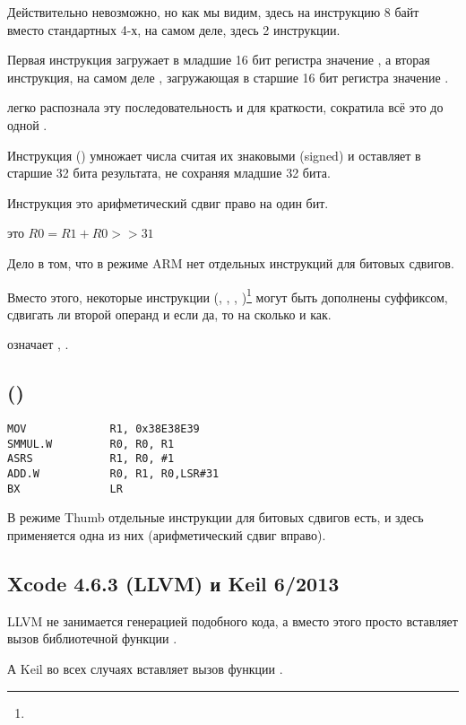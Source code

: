 Действительно невозможно, но как мы видим, здесь на инструкцию 8 байт вместо стандартных 4-х,
на самом деле, здесь 2 инструкции.

Первая инструкция загружает в младшие 16 бит регистра значение , а вторая инструкция, 
на самом деле , загружающая в старшие 16 бит регистра значение .

\IDA легко распознала эту последовательность и для краткости, сократила всё это до одной .

Инструкция  () 
умножает числа считая их знаковыми (signed) и оставляет в  старшие 32 бита результата, 
не сохраняя младшие 32 бита.

Инструкция это арифметический сдвиг право на один бит.

 это $R0=R1 + R0>>31$

\label{shifts_in_ARM_mode}
Дело в том, что в режиме ARM нет отдельных инструкций для битовых сдвигов.

Вместо этого, некоторые инструкции 
(\MOV, \ADD, \SUB, )\footnote{\DataProcessingInstructionsFootNote}
могут быть дополнены суффиксом, сдвигать ли второй операнд и если да, то на сколько и как.

 означает , \EMDASH{}.

\subsection{\OptimizingXcodeIV (\ThumbTwoMode)}

\begin{lstlisting}
MOV             R1, 0x38E38E39
SMMUL.W         R0, R0, R1
ASRS            R1, R0, #1
ADD.W           R0, R1, R0,LSR#31
BX              LR
\end{lstlisting}

В режиме Thumb отдельные инструкции для битовых сдвигов есть, и здесь применяется одна из них
\EMDASH{} (арифметический сдвиг вправо).

\subsection{\NonOptimizing Xcode 4.6.3 (LLVM) и Keil 6/2013}

\NonOptimizing LLVM 
не занимается генерацией подобного кода, а вместо этого просто вставляет вызов
библиотечной функции .

А Keil во всех случаях вставляет вызов функции .
